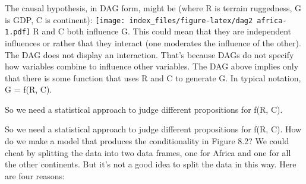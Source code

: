 \documentclass[
]{article}
\begin{document}
The causal hypothesis, in DAG form, might be (where R is terrain
ruggedness, G is GDP, C is continent):
\texttt{[image: index\_files/figure-latex/dag2 africa-1.pdf]} R and C
both influence G. This could mean that they are independent influences
or rather that they interact (one moderates the influence of the other).
The DAG does not display an interaction. That's because DAGs do not
specify how variables combine to influence other variables. The DAG
above implies only that there is some function that uses R and C to
generate G. In typical notation, G = f(R, C).

So we need a statistical approach to judge different propositions for
f(R, C).

So we need a statistical approach to judge different propositions for
f(R, C). How do we make a model that produces the conditionality in
Figure 8.2? We could cheat by splitting the data into two data frames,
one for Africa and one for all the other continents. But it's not a good
idea to split the data in this way. Here are four reasons:
\end{document}
